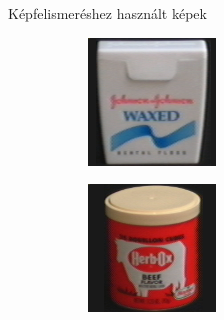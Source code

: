 \documentclass{beamer}
\begin{document}
\begin{frame}{Képfelismeréshez használt képek}
\begin{figure}
\begin{subfigure}{55pt}
        \end{subfigure}
    \end{figure}
    \vskip -5mm
    \begin{figure}
        \begin{subfigure}{55pt}
            \centering
        \includegraphics[width=\textwidth]{figures/coil_original/65.png}
        
        \end{subfigure}
        \begin{subfigure}{55pt}
            \centering
        \includegraphics[width=\textwidth]{figures/coil_original/71.png}
        

\end{subfigure}
\end{figure}
\end{frame}
\end{document}

